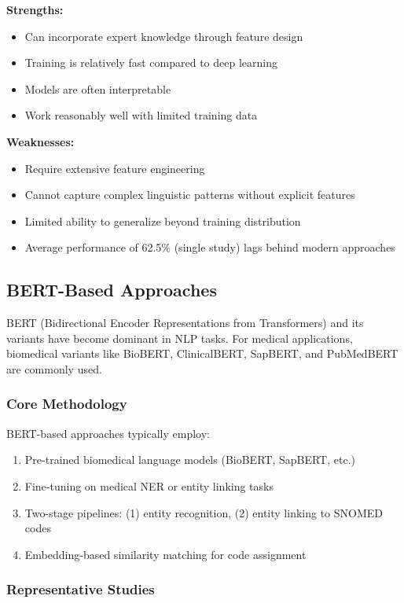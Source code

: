 \textbf{Strengths:}
\begin{itemize}
    \item Can incorporate expert knowledge through feature design
    \item Training is relatively fast compared to deep learning
    \item Models are often interpretable
    \item Work reasonably well with limited training data
\end{itemize}

\textbf{Weaknesses:}
\begin{itemize}
    \item Require extensive feature engineering
    \item Cannot capture complex linguistic patterns without explicit features
    \item Limited ability to generalize beyond training distribution
    \item Average performance of 62.5\% (single study) lags behind modern approaches
\end{itemize}

\subsection{BERT-Based Approaches}

BERT (Bidirectional Encoder Representations from Transformers) and its variants have become dominant in NLP tasks. For medical applications, biomedical variants like BioBERT, ClinicalBERT, SapBERT, and PubMedBERT are commonly used.

\subsubsection{Core Methodology}

BERT-based approaches typically employ:
\begin{enumerate}
    \item Pre-trained biomedical language models (BioBERT, SapBERT, etc.)
    \item Fine-tuning on medical NER or entity linking tasks
    \item Two-stage pipelines: (1) entity recognition, (2) entity linking to SNOMED codes
    \item Embedding-based similarity matching for code assignment
\end{enumerate}

\subsubsection{Representative Studies}

